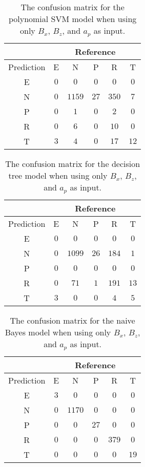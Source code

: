 \begin{table}[!ht]
	\centering
	\begin{tabular}{|c|c|c|c|c|c|}
		\hline
		 & \multicolumn{5}{|c|}{Reference} \\ \hline
		 Prediction & E & N & P & R & T \\ \hline
		 E & $0$ & $0$ & $0$ & $0$ & $0$ \\ \hline
		 N & $0$ & $1159$ & $27$ & $350$ & $7$ \\ \hline
		 P & $0$ & $1$ & $0$ & $2$ & $0$ \\ \hline
		 R & $0$ & $6$ & $0$ & $10$ & $0$ \\ \hline
		 T & $3$ & $4$ & $0$ & $17$ & $12$ \\ \hline
	\end{tabular}
	\caption{The confusion matrix for the polynomial SVM model when using only $B_{x}$, $B_{z}$, and $a_{p}$ as input.}
	\label{tab:cm:xzap:svmPoly}
\end{table}

\begin{table}[!ht]
	\centering
	\begin{tabular}{|c|c|c|c|c|c|}
		\hline
		 & \multicolumn{5}{|c|}{Reference} \\ \hline
		 Prediction & E & N & P & R & T \\ \hline
		 E & $0$ & $0$ & $0$ & $0$ & $0$ \\ \hline
		 N & $0$ & $1099$ & $26$ & $184$ & $1$ \\ \hline
		 P & $0$ & $0$ & $0$ & $0$ & $0$ \\ \hline
		 R & $0$ & $71$ & $1$ & $191$ & $13$ \\ \hline
		 T & $3$ & $0$ & $0$ & $4$ & $5$ \\ \hline
	\end{tabular}
	\caption{The confusion matrix for the decision tree model when using only $B_{x}$, $B_{z}$, and $a_{p}$ as input.}
	\label{tab:cm:xzap:C5.0}
\end{table}

\begin{table}[!ht]
	\centering
	\begin{tabular}{|c|c|c|c|c|c|}
		\hline
		 & \multicolumn{5}{|c|}{Reference} \\ \hline
		 Prediction & E & N & P & R & T \\ \hline
		 E & $3$ & $0$ & $0$ & $0$ & $0$ \\ \hline
		 N & $0$ & $1170$ & $0$ & $0$ & $0$ \\ \hline
		 P & $0$ & $0$ & $27$ & $0$ & $0$ \\ \hline
		 R & $0$ & $0$ & $0$ & $379$ & $0$ \\ \hline
		 T & $0$ & $0$ & $0$ & $0$ & $19$ \\ \hline
	\end{tabular}
	\caption{The confusion matrix for the naive Bayes model when using only $B_{x}$, $B_{z}$, and $a_{p}$ as input.}
	\label{tab:cm:xzap:nb}
\end{table}

